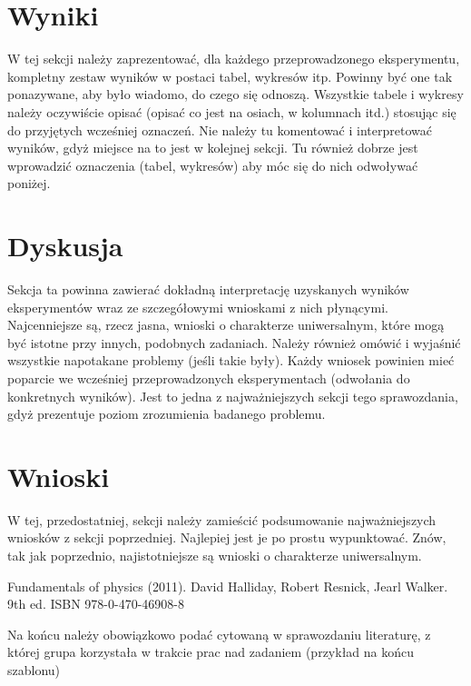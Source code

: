\documentclass{classrep}
\begin{document}
\section{Wyniki}
{\color{blue}
W tej sekcji należy zaprezentować, dla każdego przeprowadzonego eksperymentu,
kompletny zestaw wyników w postaci tabel, wykresów itp. Powinny być one tak
ponazywane, aby było wiadomo, do czego się odnoszą. Wszystkie tabele i wykresy
należy oczywiście opisać (opisać co jest na osiach, w kolumnach itd.) stosując
się do przyjętych wcześniej oznaczeń. Nie należy tu komentować i interpretować
wyników, gdyż miejsce na to jest w kolejnej sekcji. Tu również dobrze jest
wprowadzić oznaczenia (tabel, wykresów) aby móc się do nich odwoływać
poniżej.}

\section{Dyskusja}
{\color{blue}
Sekcja ta powinna zawierać dokładną interpretację uzyskanych wyników
eksperymentów wraz ze szczegółowymi wnioskami z nich płynącymi. Najcenniejsze
są, rzecz jasna, wnioski o charakterze uniwersalnym, które mogą być istotne
przy innych, podobnych zadaniach. Należy również omówić i wyjaśnić wszystkie
napotakane problemy (jeśli takie były). Każdy wniosek powinien mieć poparcie
we wcześniej przeprowadzonych eksperymentach (odwołania do konkretnych
wyników). Jest to jedna z najważniejszych sekcji tego sprawozdania, gdyż
prezentuje poziom zrozumienia badanego problemu.}
\section{Wnioski}
{\color{blue}W tej, przedostatniej, sekcji należy zamieścić podsumowanie
najważniejszych wniosków z sekcji poprzedniej. Najlepiej jest je po prostu
wypunktować. Znów, tak jak poprzednio, najistotniejsze są wnioski o
charakterze uniwersalnym.}


\begin{thebibliography}{9}
    Fundamentals of physics (2011). David Halliday, Robert Resnick, Jearl Walker. 9th ed. ISBN 978-0-470-46908-8
\end{thebibliography}
{\color{blue} 
Na końcu należy obowiązkowo podać cytowaną w sprawozdaniu
literaturę, z której grupa korzystała w trakcie prac nad zadaniem (przykład na
końcu szablonu)}
\end{document}
